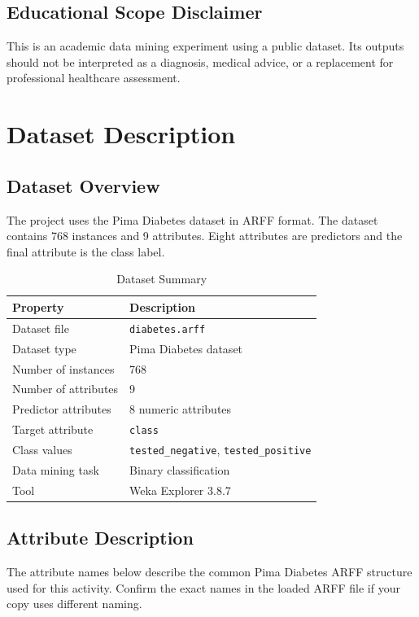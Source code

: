 \documentclass[11pt,a4paper]{article}
\begin{document}
\subsection{Educational Scope Disclaimer}
This is an academic data mining experiment using a public dataset. Its outputs should not be interpreted as a diagnosis, medical advice, or a replacement for professional healthcare assessment.

\section{Dataset Description}
\subsection{Dataset Overview}
The project uses the Pima Diabetes dataset in ARFF format. The dataset contains 768 instances and 9 attributes. Eight attributes are predictors and the final attribute is the class label.

\begin{table}[H]
\centering
\small
\caption{Dataset Summary}
\label{tab:dataset}
\begin{tabularx}{\textwidth}{lX}
\toprule
\textbf{Property} & \textbf{Description} \\
\midrule
Dataset file & \texttt{diabetes.arff} \\
Dataset type & Pima Diabetes dataset \\
Number of instances & 768 \\
Number of attributes & 9 \\
Predictor attributes & 8 numeric attributes \\
Target attribute & \texttt{class} \\
Class values & \texttt{tested\_negative}, \texttt{tested\_positive} \\
Data mining task & Binary classification \\
Tool & Weka Explorer 3.8.7 \\
\bottomrule
\end{tabularx}
\end{table}

\subsection{Attribute Description}
The attribute names below describe the common Pima Diabetes ARFF structure used for this activity. Confirm the exact names in the loaded ARFF file if your copy uses different naming.
\end{document}
